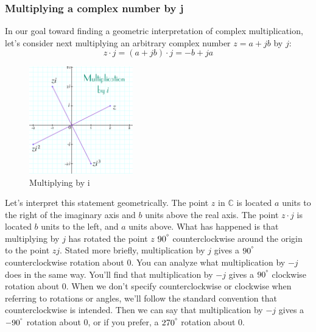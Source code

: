 \documentclass[12pt,oneside,openany]{memoir}
\numberwithin{equation}{subsection}
\begin{document}

\subsubsection{Multiplying a complex number by j}
In our goal toward finding a geometric interpretation of complex multiplication,
let's consider next multiplying an arbitrary complex number \(z = a + jb\) by
\(j\):
\[
	z \cdot j = (a + jb) \cdot j = -b + ja
\]
\bigbreak
\begin{figure}
	\centering
	\captionsetup{justification=centering}
	\includegraphics[width=0.4\textwidth]{images/multiply_by_i.png}
	\caption{Multiplying by i}
\end{figure}
Let's interpret this statement geometrically. The point \(z\) in \(\mathbb{C}\)
is located $a$ units to the right of the imaginary axis and $b$ units above the
real axis. The point $z \cdot j$ is located $b$ units to the left, and $a$ units
above. What has happened is that multiplying by $j$ has rotated the point $z$
$90^{\degree}$ counterclockwise around the origin to the point $zj$. Stated more
briefly, multiplication by $j$ gives a $90^{\degree}$ counterclockwise rotation
about 0. You can analyze what multiplication by $-j$ does in the same way.
You'll find that multiplication by $-j$ gives a $90^{\degree}$ clockwise
rotation about 0. When we don't specify counterclockwise or clockwise when
referring to rotations or angles, we'll follow the standard convention that
counterclockwise is intended. Then we can say that multiplication by $-j$ gives
a $-90^{\degree}$ rotation about 0, or if you prefer, a $270^{\degree}$ rotation
about 0.

\end{document}
